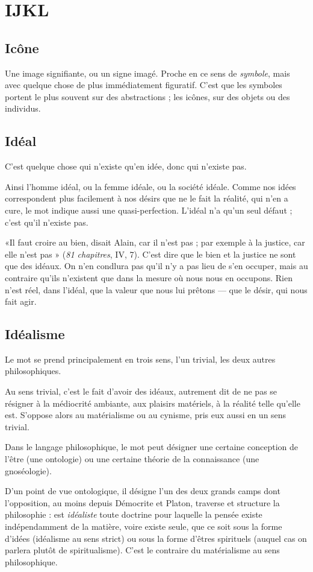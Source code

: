 
\chapter{IJKL}
\section{Icône}
Une image signifiante, ou un signe imagé. Proche en ce sens de {\it symbole},
mais avec quelque chose de plus immédiatement figuratif.
C’est que les symboles portent le plus souvent sur des abstractions ; les icônes,
sur des objets ou des individus.

\section{Idéal}
C’est quelque chose qui n’existe qu’en idée, donc qui n’existe pas.

Ainsi l’homme idéal, ou la femme idéale, ou la société idéale.
Comme nos idées correspondent plus facilement à nos désirs que ne le fait la
réalité, qui n’en a cure, le mot indique aussi une quasi-perfection. L’idéal n’a
qu’un seul défaut ; c’est qu’il n'existe pas.

«Il faut croire au bien, disait Alain, car il n’est pas ; par exemple à la justice, car
elle n’est pas » ({\it 81 chapitres}, IV, 7). C’est dire que le bien et la justice ne sont que
des idéaux. On n’en condlura pas qu’il n’y a pas lieu de s’en occuper, mais au
contraire qu'ils n'existent que dans la mesure où nous nous en occupons. Rien n'est
réel, dans l'idéal, que la valeur que nous lui prêtons — que le désir, qui nous fait agir.

\section{Idéalisme}
Le mot se prend principalement en trois sens, l’un trivial, les
deux autres philosophiques.

Au sens trivial, c’est le fait d’avoir des idéaux, autrement dit de ne pas se résigner
à la médiocrité ambiante, aux plaisirs matériels, à la réalité telle qu’elle est.
S’oppose alors au matérialisme ou au cynisme, pris eux aussi en un sens trivial.

Dans le langage philosophique, le mot peut désigner une certaine conception
de l’être (une ontologie) ou une certaine théorie de la connaissance (une
gnoséologie).

D'un point de vue ontologique, il désigne l’un des deux grands camps dont
l'opposition, au moins depuis Démocrite et Platon, traverse et structure la
philosophie : est {\it idéaliste} toute doctrine pour laquelle la pensée existe indépendamment
de la matière, voire existe seule, que ce soit sous la forme d’idées
(idéalisme au sens strict) ou sous la forme d’êtres spirituels (auquel cas on parlera
plutôt de spiritualisme). C’est le contraire du matérialisme au sens philosophique.

